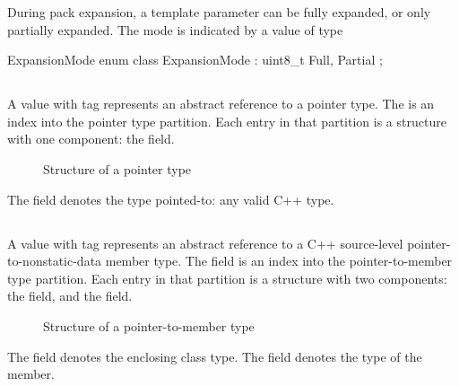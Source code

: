 During pack expansion, a template parameter can be fully expanded, or only 
partially expanded.  The mode is indicated by a value of type
%
\begin{typedef}{ExpansionMode}{}
	enum class ExpansionMode : uint8_t {
		Full, 
		Partial
	};
\end{typedef}
%


\subsection{}
\label{sec:ifc:TypeSort:Pointer}

A  value with tag  represents
an abstract reference to a pointer type.
The  is an index into the pointer type partition.
Each entry in that partition is a structure with one component: the  field.
%
\begin{figure}[H]
	\centering
	\caption{Structure of a pointer type}
	\label{fig:ifc-pointer-type-structure}
\end{figure}
%
The  field denotes the type pointed-to: any valid C++ type.


\subsection{}
\label{sec:ifc:TypeSort:PointerToMember}

A  value with tag 
represents an abstract reference to a C++ source-level pointer-to-nonstatic-data member
type.
The  field is an index into the pointer-to-member type partition.
Each entry in that partition is a structure with two components: the  field,
and the  field.
%
\begin{figure}[H]
	\centering
	\caption{Structure of a pointer-to-member type}
	\label{fig:ifc-pointer-to-member-type-structure}
\end{figure}
%
The  field denotes the enclosing class type.
The  field denotes the type of the member.

